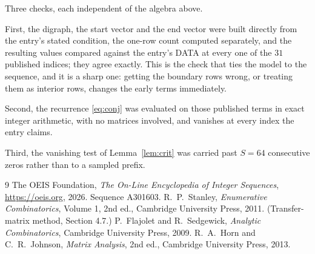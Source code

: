 \documentclass[11pt,a4paper]{article}
\theoremstyle{plain}
\theoremstyle{definition}
\begin{document}
Three checks, each independent of the algebra above.

First, the digraph, the start vector and the end vector were built directly from the
entry's stated condition, the one-row count computed separately, and the resulting values
compared against the entry's DATA at every one of the $31$ published indices; they
agree exactly. This is the check that ties the model to the sequence, and it is a sharp one:
getting the boundary rows wrong, or treating them as interior rows, changes the early terms
immediately.

Second, the recurrence \eqref{eq:conj} was evaluated on those published terms in exact
integer arithmetic, with no matrices involved, and vanishes at every index the entry claims.

Third, the vanishing test of Lemma~\ref{lem:crit} was carried past $S=64$ consecutive
zeros rather than to a sampled prefix.

\begin{thebibliography}{9}
 The OEIS Foundation, \emph{The On-Line Encyclopedia of Integer
Sequences}, \url{https://oeis.org}, 2026. Sequence A301603.
 R.~P.~Stanley, \emph{Enumerative Combinatorics}, Volume 1, 2nd ed.,
Cambridge University Press, 2011. (Transfer-matrix method, Section 4.7.)
 P.~Flajolet and R.~Sedgewick, \emph{Analytic Combinatorics}, Cambridge
University Press, 2009.
 R.~A.~Horn and C.~R.~Johnson, \emph{Matrix Analysis}, 2nd ed., Cambridge
University Press, 2013.
\end{thebibliography}
\end{document}

